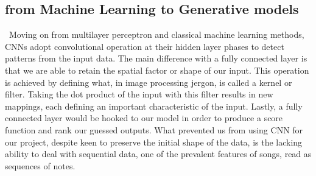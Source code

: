 \documentclass[12pt]{article}
\begin{document}
\subsection*{from Machine Learning to Generative models}
  \begin{flushright}
    \begin{minipage}[t]{0.96\linewidth}\
      Moving on from multilayer perceptron and classical machine learning methods, CNNs adopt convolutional operation at their hidden layer phases to detect patterns from the input data. The main difference with a fully connected layer is that we are able to retain the spatial factor or shape of our input. This operation is achieved by defining what, in image processing jergon, is called a kernel or filter. Taking the dot product of the input with this filter results in new mappings, each defining an important characteristic of the input. Lastly, a fully connected layer would be hooked to our model in order to produce a score function and rank our guessed outputs. What prevented us from using CNN for our project, despite keen to preserve the initial shape of the data, is the lacking ability to deal with sequential data, one of the prevalent features of songs, read as sequences of notes.
    \end{minipage}
  \end{flushright}
\end{document}
